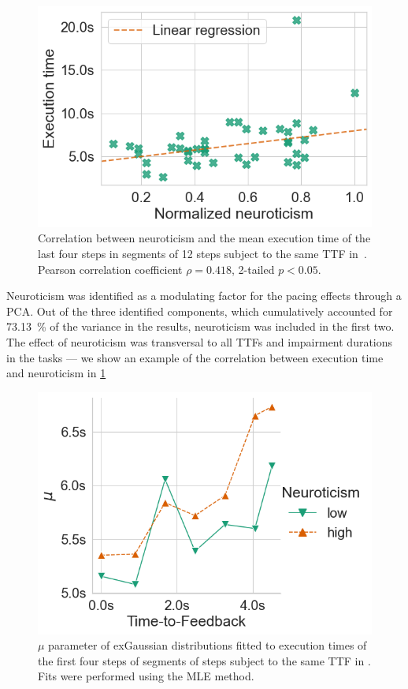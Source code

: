 \begin{figure}
    \centering
    \includegraphics[width=\columnwidth]{figs/new_model/correlation_neuro_exectime.png}
    \caption{%
        Correlation between neuroticism and the mean execution time of the last four steps in segments of \num{12} steps subject to the same \ac{TTF} in~\textcite{olguinmunoz:impact2021}.
        Pearson correlation coefficient \( \rho = 0.418 \), 2-tailed \( p < 0.05 \).
    }\label{fig:neuroexectimecorrel}
\end{figure}

Neuroticism was identified as a modulating factor for the pacing effects through a \ac{PCA}.
Out of the three identified components, which cumulatively accounted for \SI{73.13}{\percent} of the variance in the results, neuroticism was included in the first two.
The effect of neuroticism was transversal to all \acp{TTF} and impairment durations in the tasks --- we show an example of the correlation between execution time and neuroticism in \cref{fig:neuroexectimecorrel}

\begin{figure}
    \centering
    \includegraphics[width=\columnwidth]{figs/new_model/mu_fits_exgaussian_slice0.png}
    \caption{%
        \( \mu \) parameter of \acs*{exGaussian} distributions fitted to execution times of the first four steps of segments of steps subject to the same \ac{TTF} in \textcite{olguinmunoz:impact2021}.
        Fits were performed using the \ac{MLE} method.
    }\label{fig:muexgaussian}
\end{figure}

